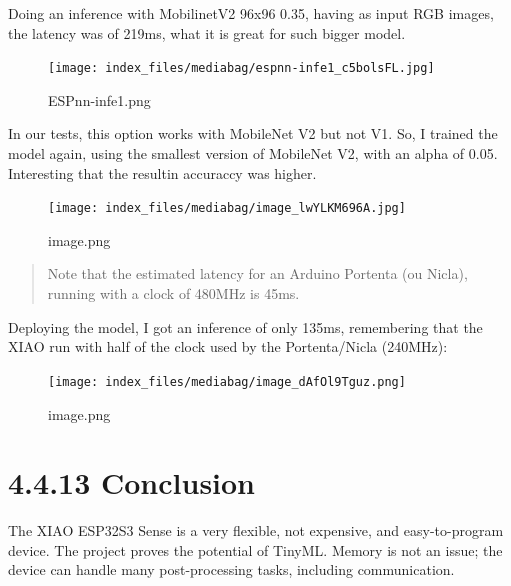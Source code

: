 \documentclass[
  letterpaper,
  DIV=11,
  numbers=noendperiod]{scrreprt}
\begin{document}
Doing an inference with MobilinetV2 96x96 0.35, having as input RGB
images, the latency was of 219ms, what it is great for such bigger
model.

\begin{figure}[H]

{\centering \texttt{[image: index\_files/mediabag/espnn-infe1\_c5bolsFL.jpg]}

}

\caption{ESPnn-infe1.png}

\end{figure}

In our tests, this option works with MobileNet V2 but not V1. So, I
trained the model again, using the smallest version of MobileNet V2,
with an alpha of 0.05. Interesting that the resultin accuraccy was
higher.

\begin{figure}[H]

{\centering \texttt{[image: index\_files/mediabag/image\_lwYLKM696A.jpg]}

}

\caption{image.png}

\end{figure}

\begin{quote}
Note that the estimated latency for an Arduino Portenta (ou Nicla),
running with a clock of 480MHz is 45ms.
\end{quote}

Deploying the model, I got an inference of only 135ms, remembering that
the XIAO run with half of the clock used by the Portenta/Nicla (240MHz):

\begin{figure}[H]

{\centering \texttt{[image: index\_files/mediabag/image\_dAfOl9Tguz.png]}

}

\caption{image.png}

\end{figure}

\hypertarget{conclusion-1}{%
\section*{4.4.13 Conclusion}\label{conclusion-1}}


The XIAO ESP32S3 Sense is a very flexible, not expensive, and
easy-to-program device. The project proves the potential of TinyML.
Memory is not an issue; the device can handle many post-processing
tasks, including communication.
\end{document}
